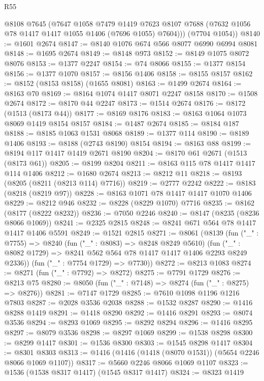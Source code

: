\begin{lexlean}{R55}
\begin{coremodule}
{{        @8108
        @7645
        (@7647
          @1058
          @7479
          @1419
          @7623
          @8107
          @7688
          (@7632 @1056 @78 @1417 @1417 @1055 @1406 (@7696 @1055) @7604)))
      (@7704 @1054))
@8140 := @1601 @2674
@8147 := @8140 @1076 @674 @566 @8077 @6990 @6994 @8081
@8148 := @1695 @2674
@8149 := @8148 @973
@8152 := @8149 @1075 @8072 @8076
@8153 := @1377 @2247
@8154 := @74 @8066
@8155 := @1377 @8154
@8156 := @1377 @1070
@8157 := @8156 @1406
@8158 := @8155 @8157
@8162 := @8152 (@8153 @8158) (@1655 @8081)
@8163 := @1499 @2674
@8164 := @8163 @70
@8169 := @8164 @1074 @1417 @8071 @2247 @8158
@8170 := @1508 @2674
@8172 := @8170 @44 @2247
@8173 := @1514 @2674
@8176 := @8172 (@1513 (@8173 @44))
@8177 := @8169 @8176
@8183 := @8163 @1064 @1073 @8069 @1419 @8154 @8157
@8184 := @1487 @2674
@8185 := @8184 @187
@8188 := @8185 @1063 @1531 @8068
@8189 := @1377 @114
@8190 := @8189 @1406
@8193 := @8188 (@2743 @8190) @8154
@8194 := @8163 @88
@8199 := @8194 @117 @1417 @1419 @2671 @8190
@8204 := @8170 @61 @2671 (@1513 (@8173 @61))
@8205 := @8199 @8204
@8211 := @8163 @115 @78 @1417 @1417 @114 @1406
@8212 := @1680 @2674
@8213 := @8212 @11
@8218 := @8193 (@8205 (@8211 (@8213 @114) @7716))
@8219 := @2777 @2242
@8222 := @8183 (@8218 (@8219 @97))
@8228 := @8163 @1071 @78 @1417 @1417 @1070 @1406
@8229 := @8212 @946
@8232 := @8228 (@8229 @1070) @7716
@8235 := @8162 (@8177 (@8222 @8232))
@8236 := @7050 @2246
@8240 := @8147 (@8235 (@8236 @8066 @1069))
@8241 := @2325 @2815
@8248 := @8241 @671 @564 @78 @1417 @1417 @1406 @5591
@8249 := @1521 @2815
@8271 := @8061
    (@8139
      (fun ("_" : @7755) =>
      @8240
        (fun ("_" : @8083) => @8248 @8249 @5610)
        (fun ("_" : @8082 @1729) => @8241 @562 @564 @78 @1417 @1417 @1406 @2293 @8249 @2336))
      (fun ("_" : @7754 @1729) => @7730))
@8272 := @8213 @1083
@8274 := @8271 (fun ("_" : @7792) => @8272)
@8275 := @7791 @1729
@8276 := @8213 @75
@8280 := @8050 (fun ("_" : @7148) => @8274 (fun ("_" : @8275) => @8276))
@8281 := @7147 @1729
@8285 := @7610 @1098 @1196 @1216 @7803
@8287 := @2028 @3536 @2038
@8288 := @1532 @8287
@8290 := @1416 @8288 @1419
@8291 := @1418 @8290
@8292 := @1416 @8291
@8293 := @8074 @3536
@8294 := @8293 @1069
@8295 := @8292 @8294
@8296 := @1416 @8295
@8297 := @8079 @3536
@8298 := @8297 @1069
@8299 := @1538 @8298
@8300 := @8299 @1417
@8301 := @1536 @8300
@8303 := @1545 @8298 @1417
@8304 := @8301 @8303
@8313 := @1416 (@1416 (@1418 (@8070 @1531)) (@5654 @2246 @8066 @1069 @1107))
@8317 := @5660 @2246 @8066 @1069 @1107
@8323 := @1536 (@1538 @8317 @1417) (@1545 @8317 @1417)
@8324 := @8323 @1419
}}
\end{coremodule}
\end{lexlean}
